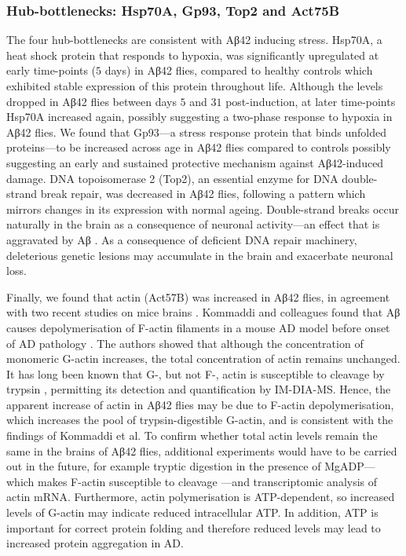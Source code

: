 \subsubsection{Hub-bottlenecks: Hsp70A, Gp93, Top2 and Act75B}

The four hub-bottlenecks are consistent with Aβ42 inducing stress.
Hsp70A, a heat shock protein that responds to hypoxia, was significantly upregulated
at early time-points ($5$ days) in Aβ42 flies, compared to healthy controls
which exhibited stable expression of this protein throughout life.
Although the levels dropped in Aβ42 flies between days $5$ and $31$ post-induction,
at later time-points Hsp70A increased again, possibly suggesting a two-phase response to
hypoxia in Aβ42 flies.
We found that Gp93—a stress response protein that binds unfolded proteins—to be increased
across age in Aβ42 flies compared to controls possibly suggesting an early and sustained
protective mechanism against Aβ42-induced damage.
DNA topoisomerase 2 (Top2), an essential enzyme for DNA double-strand break repair,
was decreased in Aβ42 flies, following a pattern which mirrors changes in its expression
with normal ageing.
Double-strand breaks occur naturally in the brain as a consequence of neuronal
activity---an effect that is aggravated by Aβ \cite{Suberbielle2013}.
As a consequence of deficient DNA repair machinery,
deleterious genetic lesions may accumulate in the brain and exacerbate neuronal loss.

Finally, we found that actin (Act57B) was increased in Aβ42 flies,
in agreement with two recent studies on mice brains \cite{Savas2017,Kommaddi2018}.
Kommaddi and colleagues found that Aβ causes depolymerisation of F-actin filaments
in a mouse AD model before onset of AD pathology \cite{Kommaddi2018}.
The authors showed that although the concentration of monomeric G-actin increases,
the total concentration of actin remains unchanged.
It has long been known that G-, but not F-,
actin is susceptible to cleavage by trypsin \cite{Jacobson1976},
permitting its detection and quantification by IM-DIA-MS.
Hence, the apparent increase of actin in Aβ42 flies may be due to F-actin depolymerisation,
which increases the pool of trypsin-digestible G-actin, and is consistent with the findings
of Kommaddi et al.
To confirm whether total actin levels remain the same in the brains of Aβ42 flies,
additional experiments would have to be carried out in the future,
for example tryptic digestion in the presence of MgADP---which makes F-actin susceptible to
cleavage \cite{Hozumi1988}---and transcriptomic analysis of actin mRNA.
Furthermore, actin polymerisation is ATP-dependent, so increased levels of G-actin
may indicate reduced intracellular ATP.
In addition, ATP is important for correct protein folding and therefore reduced levels may
lead to increased protein aggregation in AD.

